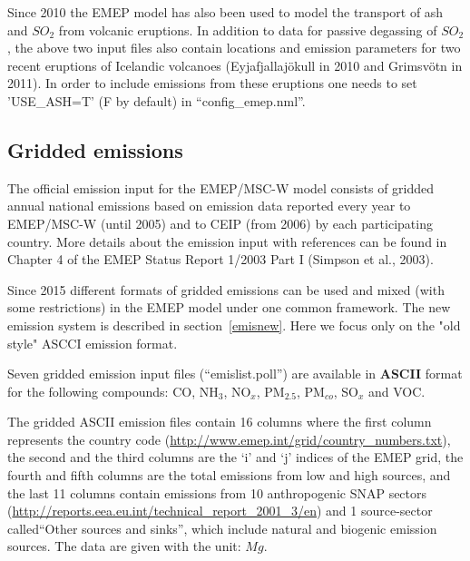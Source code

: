 Since 2010 the EMEP model has also been used to model the transport of
ash and $SO_2$ from volcanic eruptions. In addition to data for
passive degassing of $SO_2$, the above two input files also contain
locations and emission parameters for two recent eruptions of Icelandic
 volcanoes (Eyjafjallaj\"okull in 2010 and Grimsv\"otn in 2011). In
order to include emissions from these eruptions one needs to set
'USE\_ASH=T' (F by default) in ``config\_emep.nml''.



\subsection{Gridded emissions}

The official emission input for the EMEP/MSC-W model consists of
gridded 
annual national emissions based on emission data reported every year
to EMEP/MSC-W (until 2005) 
and to CEIP (from 2006) by each
participating country. 
More details about the emission input with references can be
found in Chapter 4 of the EMEP Status Report 1/2003 Part I 
(Simpson et al., 2003).

Since 2015 different formats of gridded emissions can be used and
mixed (with some restrictions) in the EMEP model under one common
framework. The new emission system is described in
section~\ref{emisnew}. Here we focus only on the "old style" ASCCI
emission format.  

Seven gridded emission input files (``emislist.poll'') are available
in  
{\bf ASCII} format for the following compounds: CO, NH$_{3}$,
NO$_{x}$, PM$_{2.5}$, PM$_{co}$, SO$_{x}$ and VOC.


The gridded ASCII emission files
contain 16 columns where the first column  
represents the country code
(\url{http://www.emep.int/grid/country_numbers.txt}), 
the second and the third columns are the `i' and `j' indices of the
EMEP grid, the fourth and fifth columns are the total emissions from
low and high sources, and the last 11 columns contain emissions from 
10 anthropogenic SNAP sectors 
(\url{http://reports.eea.eu.int/technical_report_2001_3/en}) and 1 
source-sector called``Other sources and sinks'', which include natural and
biogenic emission sources. The data are given with the unit: $Mg$.

